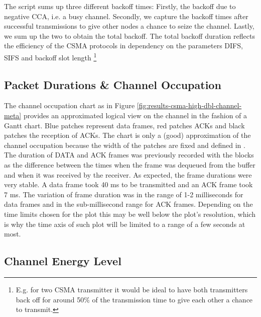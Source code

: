 The script  sums up three different backoff times: Firstly, the backoff due to negative CCA, i.e. a busy channel. Secondly, we capture the backoff times after successful transmissions to give other nodes a chance to seize the channel. Lastly, we sum up the two to obtain the total backoff. The total backoff duration reflects the efficiency of the CSMA protocols in dependency on the parameters DIFS, SIFS and backoff slot length \footnote{E.g. for two CSMA transmitter it would be ideal to have both transmitters back off for around 50\% of the transmission time to give each other a chance to transmit.}

\subsection{Packet Durations \& Channel Occupation}

The channel occupation chart as in Figure \ref{fig:results-csma-high-dbl-channel-meta} provides an approximated logical view on the channel in the fashion of a Gantt chart. Blue patches represent data frames, red patches ACKs and black patches the reception of ACKs. The chart is only a (good) approximation of the channel occupation because the width of the patches are fixed and defined in . The duration of DATA and ACK frames was previously recorded with the  blocks as the difference between the times when the frame was dequeued from the buffer and when it was received by the receiver. As expected, the frame durations were very stable. A data frame took 40 ms to be transmitted and an ACK frame took 7 ms. The variation of frame duration was in the range of 1-2  milliseconds for data frames and in the sub-millisecond range for ACK frames. Depending on the time limits chosen for the plot this may be well below the plot's resolution, which is why the time axis of such plot will be limited to a range of a few seconds at most.

\subsection{Channel Energy Level}


